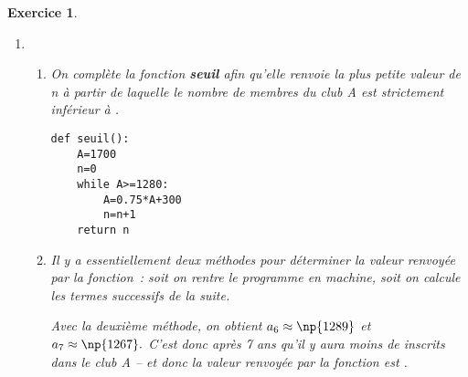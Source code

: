 \documentclass[10pt]{article}
\newtheorem{exo}{Exercice}
\begin{document}
\begin{exo}
\begin{enumerate}
\begin{enumerate}
\begin{itemize}
La propriété $\mathcal{P}_{k+1}$ est donc vraie.
\item[{\textbullet}] \textbf{Conclusion.} $\mathcal{P}_0$ est vraie et $\mathcal{P}_n$ est héréditaire, donc elle est vraie pour tout $n\in\mathbb{N}.$
\end{itemize}
		\item D'après la question précédente~:

\begin{itemize}
\item[{\textbullet}] $a_{n+1}\leq a_{n}$ pour tout $n\in\mathbb{N},$ donc $(a_n)_{n\in\mathbb{N}}$ est décroissante.
\item[{\textbullet}] $a_n\geq \np{1200}$ pour tout $n\in\mathbb{N},$ donc $(a_n)_{n\in\mathbb{N}}$ est minorée par .
\end{itemize}

Or toute suite décroissante minorée converge, donc $(a_n)_{n\in\mathbb{N}}$ converge.
		\item On note $\ell$ la limite de $\left(a_n\right)_{n\in\mathbb{N}}$ et \og on passe à la limite \fg~{} dans la formule de récurrence~:

\[a_{n+1}=0,75a_n+300\qquad\text{pour tout }n\in\mathbb{N},\] donc
\[\ell=0,75\ell+300.\]

On résout cette équation~:
\[\ell=0,75\ell+300\iff \ell-0,75\ell=300\iff 0,25\ell=300\iff\ell=\frac{300}{0,25}\iff \ell=\np{1200}.\]

Conclusion~: $\lim\limits_{n\to +\infty}a_n=\np{1200}.$
	\end{enumerate}
\item \begin{enumerate}
		\item On complète la fonction \textbf{seuil} afin qu'elle renvoie la plus petite valeur de n à partir de laquelle le nombre de membres du club A est strictement inférieur à .
		
		
\begin{lstlisting}
def seuil():
	A=1700
	n=0
	while A>=1280:
		A=0.75*A+300
		n=n+1
	return n
\end{lstlisting}




		\item Il y a essentiellement deux méthodes pour déterminer la valeur renvoyée par la fonction~: soit on rentre le programme en machine, soit on calcule les termes successifs de la suite.
		
		\medskip
		
		Avec la deuxième méthode, on obtient $a_6\approx \np{1289}$ et $a_7\approx \np{1267}.$ C'est donc après 7 ans qu'il y aura moins de  inscrits dans le club A -- et donc la valeur renvoyée par la fonction est  \fg.
	\end{enumerate}
\end{enumerate}	

\end{exo}
\end{document}
